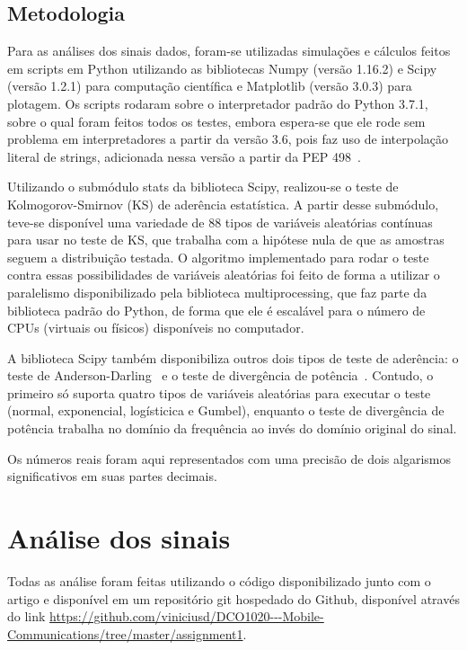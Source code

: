 \documentclass[journal,11pt,twocolumn]{IEEEtran}
\begin{document}
\subsection{Metodologia}
Para as análises dos sinais dados, foram-se utilizadas simulações e cálculos feitos em scripts em Python utilizando as bibliotecas Numpy (versão 1.16.2) e Scipy (versão 1.2.1) para computação científica e Matplotlib (versão 3.0.3) para plotagem. Os scripts rodaram sobre o interpretador padrão do Python 3.7.1, sobre o qual foram feitos todos os testes, embora espera-se que ele rode sem problema em interpretadores a partir da versão 3.6, pois faz uso de interpolação literal de strings, adicionada nessa versão a partir da PEP 498~\cite{fstrings}.

Utilizando o submódulo stats da biblioteca Scipy, realizou-se o teste de Kolmogorov-Smirnov (KS) de aderência estatística. A partir desse submódulo, teve-se disponível uma variedade de 88 tipos de variáveis aleatórias contínuas para usar no teste de KS, que trabalha com a hipótese nula de que as amostras seguem a distribuição testada\cite{kstest}. O algoritmo implementado para rodar o teste contra essas possibilidades de variáveis aleatórias foi feito de forma a utilizar o paralelismo disponibilizado pela biblioteca multiprocessing, que faz parte da biblioteca padrão do Python, de forma que ele é escalável para o número de CPUs (virtuais ou físicos) disponíveis no computador.

A biblioteca Scipy também disponibiliza outros dois tipos de teste de aderência: o teste de Anderson-Darling~\cite{anderson} e o teste de divergência de potência~\cite{power_divergence}. Contudo, o primeiro só suporta quatro tipos de variáveis aleatórias para executar o teste (normal, exponencial, logísticica e Gumbel), enquanto o teste de divergência de potência trabalha no domínio da frequência ao invés do domínio original do sinal.

Os números reais foram aqui representados com uma precisão de dois algarismos significativos em suas partes decimais.

\section{Análise dos sinais}
Todas as análise foram feitas utilizando o código disponibilizado junto com o artigo e disponível em um repositório git hospedado do Github, disponível através do link \url{https://github.com/viniciusd/DCO1020---Mobile-Communications/tree/master/assignment1}.
\end{document}
